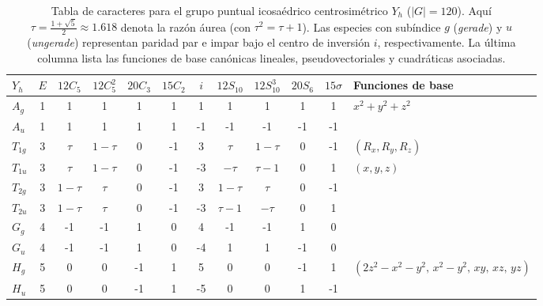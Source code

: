 \begin{table}[t]
\caption{\label{tab:yh}Tabla de caracteres para el grupo puntual icosaédrico centrosimétrico $Y_h$ ($|G|=120$). Aquí $\tau = \frac{1+\sqrt{5}}{2} \approx 1.618$ denota la razón áurea (con $\tau^2 = \tau + 1$). Las especies con subíndice $g$ (\emph{gerade}) y $u$ (\emph{ungerade}) representan paridad par e impar bajo el centro de inversión $i$, respectivamente. La última columna lista las funciones de base canónicas lineales, pseudovectoriales y cuadráticas asociadas.}
\begin{ruledtabular}
\begin{tabular}{lccccccccccl}
$Y_h$ & $E$ & $12C_5$ & $12C_5^2$ & $20C_3$ & $15C_2$ & $i$ & $12S_{10}$ & $12S_{10}^3$ & $20S_6$ & $15\sigma$ & Funciones de base \\
\hline
$A_g$   & 1 &  1      &  1      &  1  &  1  &  1 &  1       &  1       &  1  &  1 & $x^2+y^2+z^2$ \\
$A_u$   & 1 &  1      &  1      &  1  &  1  & -1 & -1       & -1       & -1  & -1 & \\
$T_{1g}$& 3 &  $\tau$ & $1-\tau$&  0  & -1  &  3 &  $\tau$  & $1-\tau$ &  0  & -1 & $(R_x, R_y, R_z)$ \\
$T_{1u}$& 3 &  $\tau$ & $1-\tau$&  0  & -1  & -3 & $-\tau$  & $\tau-1$ &  0  &  1 & $(x, y, z)$ \\
$T_{2g}$& 3 &$1-\tau$ &  $\tau$ &  0  & -1  &  3 &$1-\tau$  &  $\tau$  &  0  & -1 & \\
$T_{2u}$& 3 &$1-\tau$ &  $\tau$ &  0  & -1  & -3 &$\tau-1$  & $-\tau$  &  0  &  1 & \\
$G_g$   & 4 & -1      & -1      &  1  &  0  &  4 & -1       & -1       &  1  &  0 & \\
$G_u$   & 4 & -1      & -1      &  1  &  0  & -4 &  1       &  1       & -1  &  0 & \\
$H_g$   & 5 &  0      &  0      & -1  &  1  &  5 &  0       &  0       & -1  &  1 & $(2z^2-x^2-y^2,\, x^2-y^2,\, xy,\, xz,\, yz)$ \\
$H_u$   & 5 &  0      &  0      & -1  &  1  & -5 &  0       &  0       &  1  & -1 & \\
\end{tabular}
\end{ruledtabular}
\end{table}
